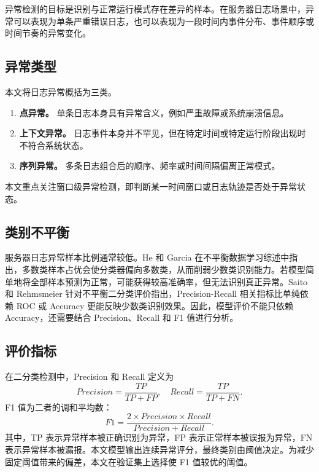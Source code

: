 异常检测的目标是识别与正常运行模式存在差异的样本。在服务器日志场景中，异常可以表现为单条严重错误日志，也可以表现为一段时间内事件分布、事件顺序或时间节奏的异常变化。

\subsection{异常类型}

本文将日志异常概括为三类。

\begin{enumerate}
    \item \textbf{点异常。} 单条日志本身具有异常含义，例如严重故障或系统崩溃信息。
    \item \textbf{上下文异常。} 日志事件本身并不罕见，但在特定时间或特定运行阶段出现时不符合系统状态。
    \item \textbf{序列异常。} 多条日志组合后的顺序、频率或时间间隔偏离正常模式。
\end{enumerate}

本文重点关注窗口级异常检测，即判断某一时间窗口或日志轨迹是否处于异常状态。

\subsection{类别不平衡}

服务器日志异常样本比例通常较低。He 和 Garcia 在不平衡数据学习综述中指出，多数类样本占优会使分类器偏向多数类，从而削弱少数类识别能力\cite{he2009imbalanced}。若模型简单地将全部样本预测为正常，可能获得较高准确率，但无法识别真正异常。Saito 和 Rehmsmeier 针对不平衡二分类评价指出，Precision-Recall 相关指标比单纯依赖 ROC 或 Accuracy 更能反映少数类识别效果\cite{saito2015precision}。因此，模型评价不能只依赖 Accuracy，还需要结合 Precision、Recall 和 F1 值进行分析。

\subsection{评价指标}

在二分类检测中，Precision 和 Recall 定义为
\begin{equation}
    Precision=\frac{TP}{TP+FP}, \quad Recall=\frac{TP}{TP+FN}.
\end{equation}
F1 值为二者的调和平均数：
\begin{equation}
    F1=\frac{2\times Precision\times Recall}{Precision+Recall}.
\end{equation}
其中，TP 表示异常样本被正确识别为异常，FP 表示正常样本被误报为异常，FN 表示异常样本被漏报。本文模型输出连续异常评分，最终类别由阈值决定。为减少固定阈值带来的偏差，本文在验证集上选择使 F1 值较优的阈值。

